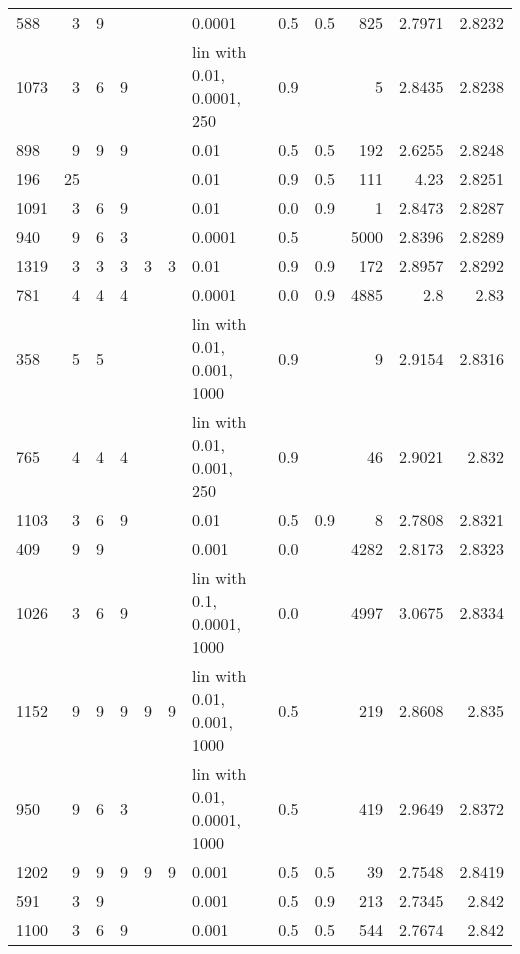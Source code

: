\begin{longtable}{lrrrrrlrrrrr}
  588 &       3 & 9 &   &   &   &                      0.0001 &      0.5 &    0.5 &     825 &     2.7971 &        2.8232 \\
 1073 &       3 & 6 & 9 &   &   &  lin with 0.01, 0.0001, 250 &      0.9 &        &       5 &     2.8435 &        2.8238 \\
  898 &       9 & 9 & 9 &   &   &                        0.01 &      0.5 &    0.5 &     192 &     2.6255 &        2.8248 \\
  196 &      25 &   &   &   &   &                        0.01 &      0.9 &    0.5 &     111 &       4.23 &        2.8251 \\
 1091 &       3 & 6 & 9 &   &   &                        0.01 &      0.0 &    0.9 &       1 &     2.8473 &        2.8287 \\
  940 &       9 & 6 & 3 &   &   &                      0.0001 &      0.5 &        &    5000 &     2.8396 &        2.8289 \\
 1319 &       3 & 3 & 3 & 3 & 3 &                        0.01 &      0.9 &    0.9 &     172 &     2.8957 &        2.8292 \\
  781 &       4 & 4 & 4 &   &   &                      0.0001 &      0.0 &    0.9 &    4885 &        2.8 &          2.83 \\
  358 &       5 & 5 &   &   &   &  lin with 0.01, 0.001, 1000 &      0.9 &        &       9 &     2.9154 &        2.8316 \\
  765 &       4 & 4 & 4 &   &   &   lin with 0.01, 0.001, 250 &      0.9 &        &      46 &     2.9021 &         2.832 \\
 1103 &       3 & 6 & 9 &   &   &                        0.01 &      0.5 &    0.9 &       8 &     2.7808 &        2.8321 \\
  409 &       9 & 9 &   &   &   &                       0.001 &      0.0 &        &    4282 &     2.8173 &        2.8323 \\
 1026 &       3 & 6 & 9 &   &   &  lin with 0.1, 0.0001, 1000 &      0.0 &        &    4997 &     3.0675 &        2.8334 \\
 1152 &       9 & 9 & 9 & 9 & 9 &  lin with 0.01, 0.001, 1000 &      0.5 &        &     219 &     2.8608 &         2.835 \\
  950 &       9 & 6 & 3 &   &   & lin with 0.01, 0.0001, 1000 &      0.5 &        &     419 &     2.9649 &        2.8372 \\
 1202 &       9 & 9 & 9 & 9 & 9 &                       0.001 &      0.5 &    0.5 &      39 &     2.7548 &        2.8419 \\
  591 &       3 & 9 &   &   &   &                       0.001 &      0.5 &    0.9 &     213 &     2.7345 &         2.842 \\
 1100 &       3 & 6 & 9 &   &   &                       0.001 &      0.5 &    0.5 &     544 &     2.7674 &         2.842 \\
\end{longtable}
